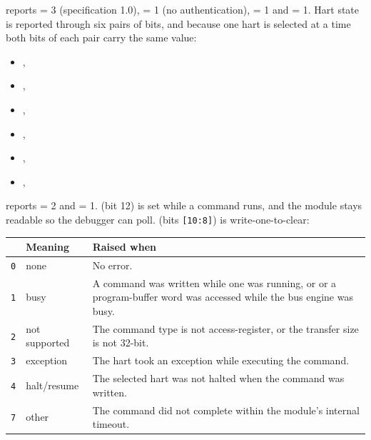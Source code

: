 \begin{sloppypar}
 reports  = 3 (specification 1.0),  = 1 (no authentication),  = 1 and  = 1. Hart state is reported through six pairs of bits, and because one hart is selected at a time both bits of each pair carry the same value:
\end{sloppypar}
\begin{itemize}
	\item {}, 
	\item {}, 
	\item {}, 
	\item {}, 
	\item {}, 
	\item {}, 
\end{itemize}

 reports  = 2 and  = 1.  (bit 12) is set while a command runs, and the module stays readable so the debugger can poll.  (bits \texttt{[10:8]}) is write-one-to-clear:

\begin{center}
\begin{tabular}{ l l p{9.2cm} }
	\textbf{\bitfield{cmderr}} & \textbf{Meaning} & \textbf{Raised when} \\ \hline
	\texttt{0} & none & No error. \\
	\rowcolor{tablehighlightcolor} \texttt{1} & busy & A command was written while one was running, or \register{data0} or a program-buffer word was accessed while the bus engine was busy. \\
	\texttt{2} & not supported & The command type is not access-register, or the transfer size is not 32-bit. \\
	\rowcolor{tablehighlightcolor} \texttt{3} & exception & The hart took an exception while executing the command. \\
	\texttt{4} & halt/resume & The selected hart was not halted when the command was written. \\
	\rowcolor{tablehighlightcolor} \texttt{7} & other & The command did not complete within the module's internal timeout. \\ \hline
\end{tabular}
\end{center}


